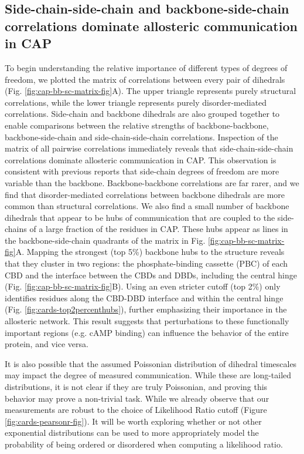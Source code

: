 \documentclass[../main.tex]{subfiles}
\begin{document}
    \subsection{Side-chain-side-chain and backbone-side-chain correlations dominate allosteric communication in CAP}
        To begin understanding the relative importance of different types of degrees of freedom, we plotted the matrix of correlations between every pair of dihedrals (Fig. \ref{fig:cap-bb-sc-matrix-fig}A). The upper triangle represents purely structural correlations, while the lower triangle represents purely disorder-mediated correlations. Side-chain and backbone dihedrals are also grouped together to enable comparisons between the relative strengths of backbone-backbone, backbone-side-chain and side-chain-side-chain correlations.
        Inspection of the matrix of all pairwise correlations immediately reveals that side-chain-side-chain correlations dominate allosteric communication in CAP. This observation is consistent with previous reports that side-chain degrees of freedom are more variable than the backbone\cite{Fraser:2011jf,bowman2014extensive,Kurplus:1983ts,brooks2006advances,Depristo:2004tb,Wand:1996hr,LindorffLarsen:2005bi,Igumenova:2006hw,Dubay:2009gv}. Backbone-backbone correlations are far rarer, and we find that disorder-mediated correlations between backbone dihedrals are more common than structural correlations.
        We also find a small number of backbone dihedrals that appear to be hubs of communication that are coupled to the side-chains of a large fraction of the residues in CAP. These hubs appear as lines in the backbone-side-chain quadrants of the matrix in Fig. \ref{fig:cap-bb-sc-matrix-fig}A. Mapping the strongest (top 5\%) backbone hubs to the structure reveals that they cluster in two regions: the phosphate-binding cassette (PBC) of each CBD and the interface between the CBDs and DBDs, including the central hinge (Fig. \ref{fig:cap-bb-sc-matrix-fig}B). Using an even stricter cutoff (top 2\%) only identifies residues along the CBD-DBD interface and within the central hinge (Fig. \ref{fig:cards-top2percenthubs}), further emphasizing their importance in the allosteric network. This result suggests that perturbations to these functionally important regions (e.g. cAMP binding) can influence the behavior of the entire protein, and vice versa.

        It is also possible that the assumed Poissonian distribution of dihedral timescales may impact the degree of measured communication. While these are long-tailed distributions, it is not clear if they are truly Poissonian, and proving this behavior may prove a non-trivial task. While we already observe that our measurements are robust to the choice of Likelihood Ratio cutoff (Figure \ref{fig:cards-pearsonr-fig}). It will be worth exploring whether or not other exponential distributions can be used to more appropriately model the probability of being ordered or disordered when computing a likelihood ratio.
\end{document}
